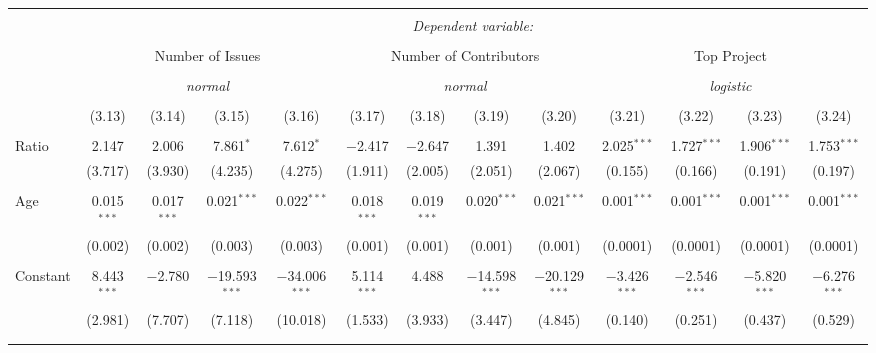 
\begin{tabular}{@{\extracolsep{5pt}}lcccccccccccc}
\\[-1.8ex]\hline
\hline \\[-1.8ex]
 & \multicolumn{12}{c}{\textit{Dependent variable:}} \\
\cline{2-13}
\\[-1.8ex] & \multicolumn{4}{c}{Number of Issues} & \multicolumn{4}{c}{Number of Contributors} & \multicolumn{4}{c}{Top Project} \\
\\[-1.8ex] & \multicolumn{4}{c}{\textit{normal}} & \multicolumn{4}{c}{\textit{normal}} & \multicolumn{4}{c}{\textit{logistic}} \\
\\[-1.8ex] & (3.13) & (3.14) & (3.15) & (3.16) & (3.17) & (3.18) & (3.19) & (3.20) & (3.21) & (3.22) & (3.23) & (3.24)\\
\hline \\[-1.8ex]
 Ratio & 2.147 & 2.006 & 7.861$^{*}$ & 7.612$^{*}$ & $-$2.417 & $-$2.647 & 1.391 & 1.402 & 2.025$^{***}$ & 1.727$^{***}$ & 1.906$^{***}$ & 1.753$^{***}$ \\
  & (3.717) & (3.930) & (4.235) & (4.275) & (1.911) & (2.005) & (2.051) & (2.067) & (0.155) & (0.166) & (0.191) & (0.197) \\
  & & & & & & & & & & & & \\
 Age & 0.015$^{***}$ & 0.017$^{***}$ & 0.021$^{***}$ & 0.022$^{***}$ & 0.018$^{***}$ & 0.019$^{***}$ & 0.020$^{***}$ & 0.021$^{***}$ & 0.001$^{***}$ & 0.001$^{***}$ & 0.001$^{***}$ & 0.001$^{***}$ \\
  & (0.002) & (0.002) & (0.003) & (0.003) & (0.001) & (0.001) & (0.001) & (0.001) & (0.0001) & (0.0001) & (0.0001) & (0.0001) \\
  & & & & & & & & & & & & \\
 Constant & 8.443$^{***}$ & $-$2.780 & $-$19.593$^{***}$ & $-$34.006$^{***}$ & 5.114$^{***}$ & 4.488 & $-$14.598$^{***}$ & $-$20.129$^{***}$ & $-$3.426$^{***}$ & $-$2.546$^{***}$ & $-$5.820$^{***}$ & $-$6.276$^{***}$ \\
  & (2.981) & (7.707) & (7.118) & (10.018) & (1.533) & (3.933) & (3.447) & (4.845) & (0.140) & (0.251) & (0.437) & (0.529) \\
  & & & & & & & & & & & & \\
\hline \\[-1.8ex]

\end{tabular}

